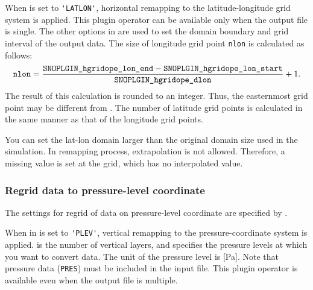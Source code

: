 When  is set to \verb|'LATLON'|,
horizontal remapping to the latitude-longitude grid system is applied.
This plugin operator can be available only when the output file is single.
The other options in 
are used to set the domain boundary and grid interval of the output data.
The size of longitude grid point \verb|nlon| is calculated as follows:
\begin{eqnarray}
  \nmitemeq{nlon} = \frac{\nmitemeq{SNOPLGIN_hgridope_lon_end} - \nmitemeq{SNOPLGIN_hgridope_lon_start} }{\nmitemeq{SNOPLGIN_hgridope_dlon}} + 1\nonumber.
\end{eqnarray}
\noindent
The result of this calculation is rounded to an integer.
Thus, the easternmost grid point may be different from .
The number of latitude grid points is calculated in the same manner as that of the longitude grid points.

You can set the lat-lon domain larger than the original domain size used in the simulation.
In remapping process, extrapolation is not allowed.
Therefore, a missing value is set at the grid, which has no interpolated value.


\subsubsection{Regrid data to pressure-level coordinate}

The settings for regrid of data on pressure-level coordinate are specified by .
%

When  in 
is set to \verb|'PLEV'|, vertical remapping to the pressure-coordinate system is applied.
 is the number of vertical layers,
and  specifies the pressure levels at which you want to convert data.
The unit of the pressure level is [Pa].
Note that pressure data (\verb|PRES|) must be included in the input file.
This plugin operator is available even when the output file is multiple.

